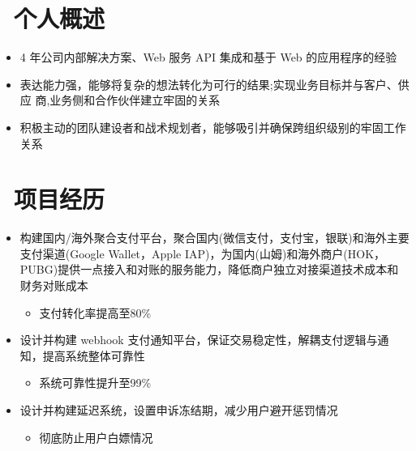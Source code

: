 \documentclass{resume}
\begin{document}



\section{\faUser\ 个人概述}
  \begin{itemize}
    \item 4 年公司内部解决方案、Web 服务 API 集成和基于 Web 的应用程序的经验
    \item 表达能力强，能够将复杂的想法转化为可行的结果;实现业务目标并与客户、供应
商,业务侧和合作伙伴建立牢固的关系
    \item 积极主动的团队建设者和战术规划者，能够吸引并确保跨组织级别的牢固工作关系
  \end{itemize}

\section{\faUsers\ 项目经历}

\begin{itemize}
  \item 构建国内/海外聚合支付平台，聚合国内(微信支付，支付宝，银联)和海外主要 支付渠道(Google Wallet，Apple IAP)，为国内(山姆)和海外商户(HOK， PUBG)提供一点接入和对账的服务能力，降低商户独立对接渠道技术成本和财务对账成本
  \begin{itemize}
    \item 支付转化率提高至80\%
  \end{itemize}
  \item 设计并构建 webhook 支付通知平台，保证交易稳定性，解耦支付逻辑与通知，提高系统整体可靠性
  \begin{itemize}
    \item 系统可靠性提升至99\%
  \end{itemize}
  \item 设计并构建延迟系统，设置申诉冻结期，减少用户避开惩罚情况
  \begin{itemize}
    \item 彻底防止用户白嫖情况
  \end{itemize}
\end{itemize}
\end{document}
